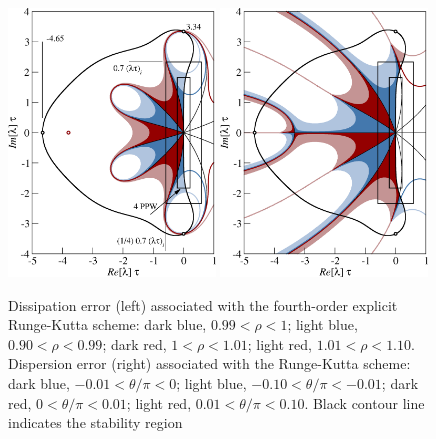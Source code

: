 {\begin{figure}
\includegraphics[clip,width=0.49\textwidth]{figs/Rkm5Dissipation.png}\hfill
\includegraphics[clip,width=0.49\textwidth]{figs/Rkm5Dispersion.png}
\caption{Dissipation error (left) associated with the fourth-order explicit
  Runge-Kutta scheme: dark blue, $0.99<\rho<1$; light blue, $0.90<\rho<0.99$;
  dark red, $1<\rho<1.01$; light red, $1.01<\rho<1.10$. Dispersion error (right)
  associated with the Runge-Kutta scheme: dark blue, $-0.01<\theta/\pi<0$; light
  blue, $-0.10<\theta/\pi<-0.01$; dark red, $0<\theta/\pi<0.01$; light red,
  $0.01<\theta/\pi<0.10$. Black contour line indicates the stability
  region}\label{fig:rkm}
\end{figure}

}
